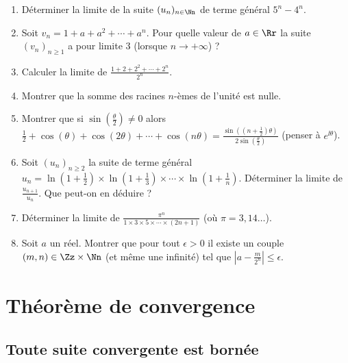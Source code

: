 \documentclass[class=report,crop=false]{standalone}
\begin{document}
\begin{miniexercices}
\sauteligne
\begin{enumerate}
  \item Déterminer la limite de la suite $(u_n)_{n\in \Nn}$ de terme général $5^n-4^n$.

  \item Soit $v_n=1+a+a^2+\cdots + a^n$. Pour quelle valeur de $a \in \Rr$ la suite
  $(v_n)_{n\ge 1}$ a pour limite $3$ (lorsque $n \to + \infty$) ?

  \item Calculer la limite de $\frac{1+2+2^2+\cdots + 2^n}{2^n}$.

  \item Montrer que la somme des racines $n$-èmes de l'unité est nulle.

  \item Montrer que si $\sin(\frac \theta 2)\neq 0$ alors
  $\frac{1}{2}+\cos(\theta )+\cos(2\theta )+\cdots+\cos(n\theta )
  =\frac{\sin\left( (n+ \frac{1}{2})\theta \right)}{2\sin(\frac{\theta }{2})}$
  (penser à $e^{\ii\theta}$).

  \item Soit $(u_n)_{n\geq 2}$ la suite de terme général
  $u_n= \ln(1+\frac12)\times\ln(1+\frac 13)\times\cdots\times\ln(1+\frac1n)$.
Déterminer la limite de $\frac{u_{n+1}}{u_n}$. Que peut-on en déduire ?
  \item Déterminer la limite de $\frac{\pi^n}{1\times 3 \times 5 \times \cdots \times (2n+1)}$
  (où $\pi = 3,14\ldots$).

   \item Soit $a$ un réel. Montrer que pour tout $\epsilon>0$ il existe un couple
   $(m,n)\in \Zz\times \Nn$ (et même une infinité)
tel que $\left|a-\frac{m}{2^n}\right|\leq \epsilon$.
\end{enumerate}
\end{miniexercices}

\section{Théorème de convergence}

\subsection{Toute suite convergente est bornée}
\end{document}
